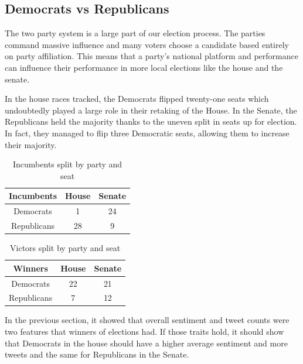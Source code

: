 \documentclass[11pt, twoside, reqno]{book}
\begin{document}
\subsection{Democrats vs Republicans}
\hspace{0.2in}The two party system is a large part of our election process. The parties command massive influence and many voters choose a candidate based entirely on party affiliation. This means that a party's national platform and performance can influence their performance in more local elections like the house and the senate. 

In the house races tracked, the Democrats flipped twenty-one seats which undoubtedly played a large role in their retaking of the House. In the Senate, the Republicans held the majority thanks to the uneven split in seats up for election. In fact, they managed to flip three Democratic seats, allowing them to increase their majority. 

\begin{table}[H]
\centering
\begin{tabular}{|c|c|c|}
	\hline
	Incumbents & House & Senate \\
	\hline
	Democrats & 1 & 24\\
	\hline
	Republicans & 28 & 9\\
	\hline
\end{tabular}
\caption{Incumbents split by party and seat}\label{fig:incumbents_party_split}
\end{table}

\begin{table}[H]
\centering
\begin{tabular}{|c|c|c|}
	\hline
	Winners & House & Senate \\
	\hline
	Democrats & 22 & 21 \\
	\hline
	Republicans & 7 & 12 \\
	\hline
\end{tabular}
\caption{Victors split by party and seat}\label{fig:victors_party_split}
\end{table}

In the previous section, it showed that overall sentiment and tweet counts were two features that winners of elections had. If those traits hold, it should show that Democrats in the house should have a higher average sentiment and more tweets and the same for Republicans in the Senate. 
\end{document}
